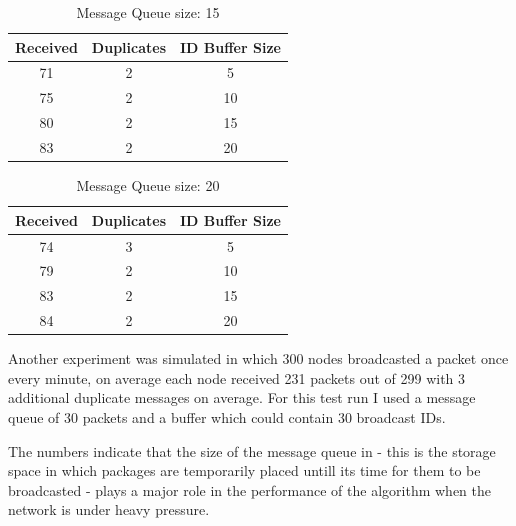 \documentclass[a4paper]{article}
\begin{document}
\begin{table}[H]
\centering
\begin{tabular}{|c|c|c|}
\hline
Received&	Duplicates& 	ID Buffer Size \\
\hline
71&2&5 \\
\hline
75&2&10 \\
\hline
80&2&15 \\
\hline
83&2&20 \\
\hline
\end{tabular}
\label{f3}
\caption{Message Queue size: 15}
\end{table}


\begin{table}[H]
\centering
\begin{tabular}{|c|c|c|}
\hline
Received&	Duplicates& 	ID Buffer Size \\
\hline
74&3&5 \\
\hline
79&2&10 \\
\hline
83&2&15 \\
\hline
84&2&20 \\
\hline
\end{tabular}
\label{f4}
\caption{Message Queue size: 20}
\end{table}

Another experiment was simulated in which 300 nodes broadcasted a packet once every minute, on average each node
received 231 packets out of 299 with 3 additional duplicate messages on average. For this test run I used a
message queue of 30 packets and a buffer which could contain 30 broadcast IDs.

The numbers indicate that the size of the message queue in - this is the storage space in which packages 
are temporarily placed untill its time for them to be broadcasted - plays a major role in the performance
of the algorithm when the network is under heavy pressure.
\end{document}
